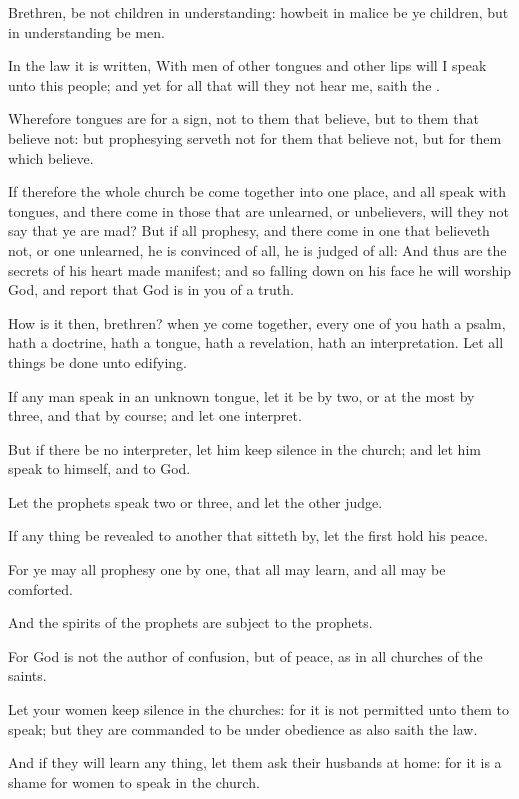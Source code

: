 \verse Brethren, be not children in understanding: howbeit in malice be ye children, but in understanding be men.

\verse In the law it is written, With men of other tongues and other lips will I speak unto this people; and yet for all that will they not hear me, saith the \LORD.

\verse Wherefore tongues are for a sign, not to them that believe, but to them that believe not: but prophesying serveth not for them that believe not, but for them which believe.

\verse If therefore the whole church be come together into one place, and all speak with tongues, and there come in those that are unlearned, or unbelievers, will they not say that ye are mad?  \verse But if all prophesy, and there come in one that believeth not, or one unlearned, he is convinced of all, he is judged of all: \verse And thus are the secrets of his heart made manifest; and so falling down on his face he will worship God, and report that God is in you of a truth.

\verse How is it then, brethren? when ye come together, every one of you hath a psalm, hath a doctrine, hath a tongue, hath a revelation, hath an interpretation. Let all things be done unto edifying.

\verse If any man speak in an unknown tongue, let it be by two, or at the most by three, and that by course; and let one interpret.

\verse But if there be no interpreter, let him keep silence in the church; and let him speak to himself, and to God.

\verse Let the prophets speak two or three, and let the other judge.

\verse If any thing be revealed to another that sitteth by, let the first hold his peace.

\verse For ye may all prophesy one by one, that all may learn, and all may be comforted.

\verse And the spirits of the prophets are subject to the prophets.

\verse For God is not the author of confusion, but of peace, as in all churches of the saints.

\verse Let your women keep silence in the churches: for it is not permitted unto them to speak; but they are commanded to be under obedience as also saith the law.

\verse And if they will learn any thing, let them ask their husbands at home: for it is a shame for women to speak in the church.

